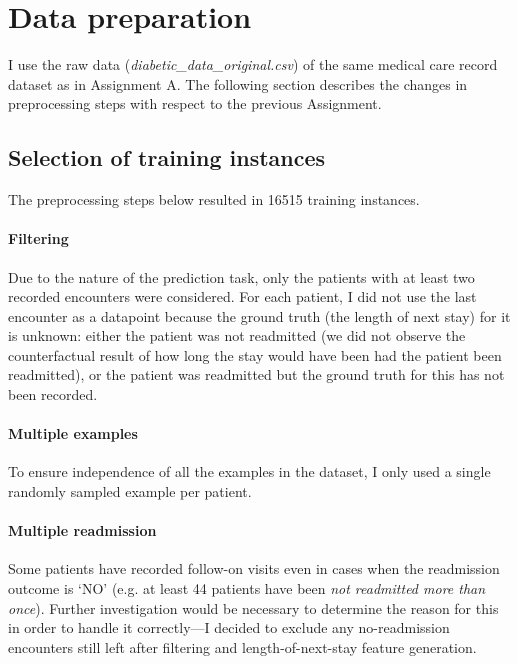 \documentclass[10pt, twocolumn]{article}
\begin{document}
\thispagestyle{first}
\pagestyle{plain}


\section{Data preparation}

I use the raw data (\textit{diabetic\_data\_original.csv}) of the same medical care record dataset \cite{strack2014dataset} as in Assignment A. The following section describes the changes in preprocessing steps with respect to the previous Assignment.

\subsection{Selection of training instances}
The preprocessing steps below resulted in 16515 training instances.

\paragraph{Filtering}
Due to the nature of the prediction task, only the patients with at least two recorded encounters were considered. For each patient, I did not use the last encounter as a datapoint because the ground truth (the length of next stay) for it is unknown: either the patient was not readmitted (we did not observe the counterfactual result of how long the stay would have been had the patient been readmitted), or the patient was readmitted but the ground truth for this has not been recorded. 

\paragraph{Multiple examples} To ensure independence of all the examples in the dataset, I only used a single randomly sampled example per patient. 

\paragraph{Multiple readmission} Some patients have recorded follow-on visits even in cases when the readmission outcome is `NO' (e.g. at least 44 patients have been \textit{not readmitted more than once}). Further investigation would be necessary to determine the reason for this in order to handle it correctly—I decided to exclude any no-readmission encounters still left after filtering and length-of-next-stay feature generation. 
\end{document}
